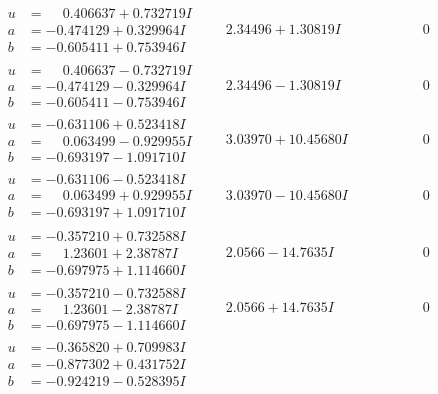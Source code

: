 \documentclass[1p]{elsarticle_modified}
\theoremstyle{definition}
\begin{document}
$$\begin{array}{c|c|c}
\begin{aligned}
u &= \phantom{-}0.406637 + 0.732719 I \\
a &= -0.474129 + 0.329964 I \\
b &= -0.605411 + 0.753946 I\end{aligned}
 & \phantom{-}2.34496 + 1.30819 I & \phantom{-0.000000 } 0 \\ \hline\begin{aligned}
u &= \phantom{-}0.406637 - 0.732719 I \\
a &= -0.474129 - 0.329964 I \\
b &= -0.605411 - 0.753946 I\end{aligned}
 & \phantom{-}2.34496 - 1.30819 I & \phantom{-0.000000 } 0 \\ \hline\begin{aligned}
u &= -0.631106 + 0.523418 I \\
a &= \phantom{-}0.063499 - 0.929955 I \\
b &= -0.693197 - 1.091710 I\end{aligned}
 & \phantom{-}3.03970 + 10.45680 I & \phantom{-0.000000 } 0 \\ \hline\begin{aligned}
u &= -0.631106 - 0.523418 I \\
a &= \phantom{-}0.063499 + 0.929955 I \\
b &= -0.693197 + 1.091710 I\end{aligned}
 & \phantom{-}3.03970 - 10.45680 I & \phantom{-0.000000 } 0 \\ \hline\begin{aligned}
u &= -0.357210 + 0.732588 I \\
a &= \phantom{-}1.23601 + 2.38787 I \\
b &= -0.697975 + 1.114660 I\end{aligned}
 & \phantom{-}2.0566 - 14.7635 I & \phantom{-0.000000 } 0 \\ \hline\begin{aligned}
u &= -0.357210 - 0.732588 I \\
a &= \phantom{-}1.23601 - 2.38787 I \\
b &= -0.697975 - 1.114660 I\end{aligned}
 & \phantom{-}2.0566 + 14.7635 I & \phantom{-0.000000 } 0 \\ \hline\begin{aligned}
u &= -0.365820 + 0.709983 I \\
a &= -0.877302 + 0.431752 I \\
b &= -0.924219 - 0.528395 I\end{aligned}

\end{array}$$
\end{document}
